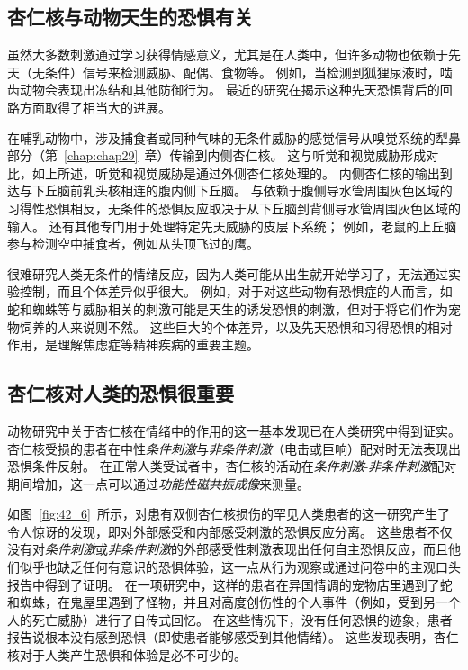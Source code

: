 \subsection{杏仁核与动物天生的恐惧有关}

虽然大多数刺激通过学习获得情感意义，尤其是在人类中，但许多动物也依赖于先天（无条件）信号来检测威胁、配偶、食物等。
例如，当检测到狐狸尿液时，啮齿动物会表现出冻结和其他防御行为。
最近的研究在揭示这种先天恐惧背后的回路方面取得了相当大的进展。


在哺乳动物中，涉及捕食者或同种气味的无条件威胁的感觉信号从嗅觉系统的犁鼻部分（第~\ref{chap:chap29}~章）传输到内侧杏仁核。
这与听觉和视觉威胁形成对比，如上所述，听觉和视觉威胁是通过外侧杏仁核处理的。
内侧杏仁核的输出到达与下丘脑前乳头核相连的腹内侧下丘脑。
与依赖于腹侧导水管周围灰色区域的习得性恐惧相反，无条件的恐惧反应取决于从下丘脑到背侧导水管周围灰色区域的输入。
还有其他专门用于处理特定先天威胁的皮层下系统；
例如，老鼠的上丘脑参与检测空中捕食者，例如从头顶飞过的鹰。


很难研究人类无条件的情绪反应，因为人类可能从出生就开始学习了，无法通过实验控制，而且个体差异似乎很大。
例如，对于对这些动物有恐惧症的人而言，如蛇和蜘蛛等与威胁相关的刺激可能是天生的诱发恐惧的刺激，但对于将它们作为宠物饲养的人来说则不然。
这些巨大的个体差异，以及先天恐惧和习得恐惧的相对作用，是理解焦虑症等精神疾病的重要主题。



\subsection{杏仁核对人类的恐惧很重要}

动物研究中关于杏仁核在情绪中的作用的这一基本发现已在人类研究中得到证实。
杏仁核受损的患者在中性\textit{条件刺激}与\textit{非条件刺激}（电击或巨响）配对时无法表现出恐惧条件反射。
在正常人类受试者中，杏仁核的活动在\textit{条件刺激}-\textit{非条件刺激}配对期间增加，这一点可以通过\textit{功能性磁共振成像}来测量。


如图~\ref{fig:42_6}~所示，对患有双侧杏仁核损伤的罕见人类患者的这一研究产生了令人惊讶的发现，即对外部感受和内部感受刺激的恐惧反应分离。
这些患者不仅没有对\textit{条件刺激}或\textit{非条件刺激}的外部感受性刺激表现出任何自主恐惧反应，而且他们似乎也缺乏任何有意识的恐惧体验，这一点从行为观察或通过问卷中的主观口头报告中得到了证明。
在一项研究中，这样的患者在异国情调的宠物店里遇到了蛇和蜘蛛，在鬼屋里遇到了怪物，并且对高度创伤性的个人事件（例如，受到另一个人的死亡威胁）进行了自传式回忆。
在这些情况下，没有任何恐惧的迹象，患者报告说根本没有感到恐惧（即使患者能够感受到其他情绪）。
这些发现表明，杏仁核对于人类产生恐惧和体验是必不可少的。


